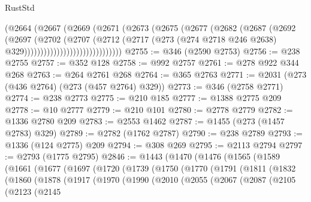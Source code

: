 \begin{lexlean}{RustStd}
\begin{coremodule}
{\begin{coremodule}
{{{{{{{{{{{{{{{{{{{{{{{{{{{{{{{{{{{{{{{{{{{{{{{{{{{{{{{{{{{{{{{{{{{{{{{{{{{{{{{{{{{{{                                (@2664
                                  (@2667
                                    (@2669
                                      (@2671
                                        (@2673
                                          (@2675
                                            (@2677
                                              (@2682
                                                (@2687
                                                  (@2692
                                                    (@2697
                                                      (@2702
                                                        (@2707
                                                          (@2712
                                                            (@2717
                                                              (@273
                                                                (@274 @2718 @246 @2638)
                                                                @329))))))))))))))))))))))))))))))
@2755 := @346 (@2590 @2753)
@2756 := @238 @2755
@2757 := @352 @128
@2758 := @992 @2757
@2761 := @278 @922 @344 @268
@2763 := @264 @2761 @268
@2764 := @365 @2763
@2771 := @2031 (@273 (@436 @2764) (@273 (@457 @2764) @329))
@2773 := @346 (@2758 @2771)
@2774 := @238 @2773
@2775 := @210 @185
@2777 := @1388 @2775 @209
@2778 := @10 @2777
@2779 := @210 @101
@2780 := @2778 @2779
@2782 := @1336 @2780 @209
@2783 := @2553 @1462
@2787 := @1455 (@273 (@1457 @2783) @329)
@2789 := @2782 (@1762 @2787)
@2790 := @238 @2789
@2793 := @1336 (@124 @2775) @209
@2794 := @308 @269
@2795 := @2113 @2794
@2797 := @2793 (@1775 @2795)
@2846 := @1443
    (@1470
      (@1476
        (@1565
          (@1589
            (@1661
              (@1677
                (@1697
                  (@1720
                    (@1739
                      (@1750
                        (@1770
                          (@1791
                            (@1811
                              (@1832
                                (@1860
                                  (@1878
                                    (@1917
                                      (@1970
                                        (@1990
                                          (@2010
                                            (@2055
                                              (@2067
                                                (@2087
                                                  (@2105
                                                    (@2123
                                                      (@2145
}}}}}}}}}}}}}}}}}}}}}}}}}}}}}}}}}}}}}}}}}}}}}}}}}}}}}}}}}}}}}}}}}}}}}}}}}}}}}}}}}}}}}
\end{coremodule}}
\end{coremodule}
\end{lexlean}
